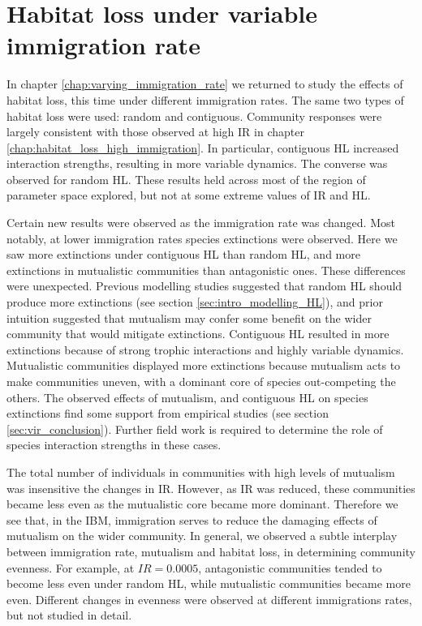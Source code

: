 \section{Habitat loss under variable immigration rate}
\label{sec:hl_var}

In chapter \ref{chap:varying_immigration_rate} we returned to study the effects of habitat loss, this time under different immigration rates. The same two types of habitat loss were used: random and contiguous. Community responses were largely consistent with those observed at high IR in chapter \ref{chap:habitat_loss_high_immigration}. In particular, contiguous HL increased interaction strengths, resulting in more variable dynamics. The converse was observed for random HL. These results held across most of the region of parameter space explored, but not at some extreme values of IR and HL. 

Certain new results were observed as the immigration rate was changed. Most notably, at lower immigration rates species extinctions were observed. Here we saw more extinctions under contiguous HL than random HL, and more extinctions in mutualistic communities than antagonistic ones. These differences were unexpected. Previous modelling studies suggested that random HL should produce more extinctions (see section \ref{sec:intro_modelling_HL}), and prior intuition suggested that mutualism may confer some benefit on the wider community that would mitigate extinctions. Contiguous HL resulted in more extinctions because of strong trophic interactions and highly variable dynamics. Mutualistic communities displayed more extinctions because mutualism acts to make communities uneven, with a dominant core of species out-competing the others. The observed effects of mutualism, and contiguous HL on species extinctions find some support from empirical studies (see section \ref{sec:vir_conclusion}). Further field work is required to determine the role of species interaction strengths in these cases.

The total number of individuals in communities with high levels of mutualism was insensitive the changes in IR. However, as IR was reduced, these communities became less even as the mutualistic core became more dominant. Therefore we see that, in the IBM, immigration serves to reduce the damaging effects of mutualism on the wider community. In general, we observed a subtle interplay between immigration rate, mutualism and habitat loss, in determining community evenness. For example, at $IR=0.0005$, antagonistic communities tended to become less even under random HL, while mutualistic communities became more even. Different changes in evenness were observed at different immigrations rates, but not studied in detail.

